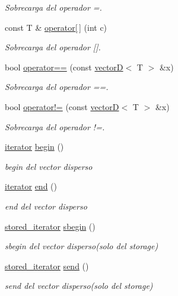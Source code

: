 \begin{DoxyCompactItemize}
\begin{DoxyCompactList}\small\item\em Sobrecarga del operador =. \end{DoxyCompactList}\item 
const T \& \hyperlink{classvectorD_a722cc52455ae7ef390f5efe68c072144}{operator\mbox{[}$\,$\mbox{]}} (int c)
\begin{DoxyCompactList}\small\item\em Sobrecarga del operador \mbox{[}\mbox{]}. \end{DoxyCompactList}\item 
bool \hyperlink{classvectorD_aed700403ca35827de446fe51bba78f03}{operator==} (const \hyperlink{classvectorD}{vectorD}$<$ T $>$ \&x)
\begin{DoxyCompactList}\small\item\em Sobrecarga del operador ==. \end{DoxyCompactList}\item 
bool \hyperlink{classvectorD_af5d305276111068683ba3b2ebb27fc49}{operator!=} (const \hyperlink{classvectorD}{vectorD}$<$ T $>$ \&x)
\begin{DoxyCompactList}\small\item\em Sobrecarga del operador !=. \end{DoxyCompactList}\item 
\hyperlink{classvectorD_1_1iterator}{iterator} \hyperlink{classvectorD_a8fee40b3302a146d4ab223dc661c3485}{begin} ()
\begin{DoxyCompactList}\small\item\em begin del vector disperso \end{DoxyCompactList}\item 
\hyperlink{classvectorD_1_1iterator}{iterator} \hyperlink{classvectorD_af2301219618c45aa9fc785819351b67a}{end} ()
\begin{DoxyCompactList}\small\item\em end del vector disperso \end{DoxyCompactList}\item 
\hyperlink{classvectorD_1_1stored__iterator}{stored\+\_\+iterator} \hyperlink{classvectorD_a92badd6d91c22212a46e4b3e8a264935}{sbegin} ()
\begin{DoxyCompactList}\small\item\em sbegin del vector disperso(solo del storage) \end{DoxyCompactList}\item 
\hyperlink{classvectorD_1_1stored__iterator}{stored\+\_\+iterator} \hyperlink{classvectorD_a946a442ec127077eca2c03e06c418109}{send} ()
\begin{DoxyCompactList}\small\item\em send del vector disperso(solo del storage) \end{DoxyCompactList}\end{DoxyCompactItemize}


